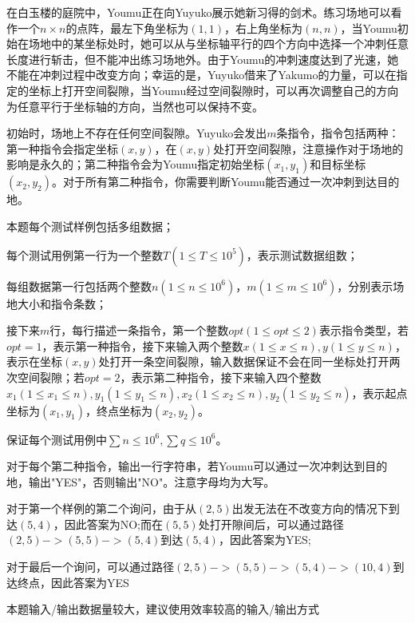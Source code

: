 
在白玉楼的庭院中，Youmu正在向Yuyuko展示她新习得的剑术。练习场地可以看作一个$n\times n$的点阵，最左下角坐标为$(1,1)$，右上角坐标为$(n,n)$，当Youmu初始在场地中的某坐标处时，她可以从与坐标轴平行的四个方向中选择一个冲刺任意长度进行斩击，但不能冲出练习场地外。由于Youmu的冲刺速度达到了光速，她不能在冲刺过程中改变方向；幸运的是，Yuyuko借来了Yakumo的力量，可以在指定的坐标上打开空间裂隙，当Youmu经过空间裂隙时，可以再次调整自己的方向为任意平行于坐标轴的方向，当然也可以保持不变。

初始时，场地上不存在任何空间裂隙。Yuyuko会发出$m$条指令，指令包括两种：第一种指令会指定坐标$(x,y)$，在$(x,y)$处打开空间裂隙，注意操作对于场地的影响是永久的；第二种指令会为Youmu指定初始坐标$(x_1,y_1)$和目标坐标$(x_2,y_2)$。对于所有第二种指令，你需要判断Youmu能否通过一次冲刺到达目的地。


本题每个测试样例包括多组数据；

每个测试用例第一行为一个整数$T(1\leqslant T\leqslant 10^5)$，表示测试数据组数；

每组数据第一行包括两个整数$n(1\leqslant n \leqslant 10^6)$，$m(1\leqslant m \leqslant 10^6)$，分别表示场地大小和指令条数；

接下来$m$行，每行描述一条指令，第一个整数$opt(1\leqslant opt \leqslant 2)$表示指令类型，若$opt=1$，表示第一种指令，接下来输入两个整数$x(1\leqslant x \leqslant n),y(1\leqslant y \leqslant n)$，表示在坐标$(x,y)$处打开一条空间裂隙，输入数据保证不会在同一坐标处打开两次空间裂隙；若$opt=2$，表示第二种指令，接下来输入四个整数$x_1(1\leqslant x_1 \leqslant n),y_1(1\leqslant y_1 \leqslant n),x_2(1\leqslant x_2 \leqslant n),y_2(1\leqslant y_2 \leqslant n)$，表示起点坐标为$(x_1,y_1)$，终点坐标为$(x_2,y_2)$。

保证每个测试用例中$\sum{n}\leqslant 10^6,\sum{q}\leqslant 10^6$。


对于每个第二种指令，输出一行字符串，若Youmu可以通过一次冲刺达到目的地，输出"YES"，否则输出"NO"。注意字母均为大写。




对于第一个样例的第二个询问，由于从$(2,5)$出发无法在不改变方向的情况下到达$(5,4)$，因此答案为NO;而在$(5,5)$处打开隙间后，可以通过路径$(2,5)->(5,5)->(5,4)$到达$(5,4)$，因此答案为YES;

对于最后一个询问，可以通过路径$(2,5)->(5,5)->(5,4)->(10,4)$到达终点，因此答案为YES

本题输入/输出数据量较大，建议使用效率较高的输入/输出方式